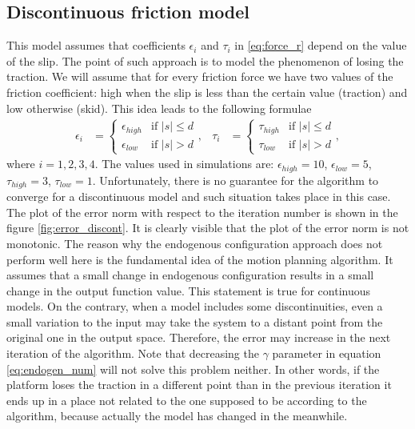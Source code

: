 \subsection{Discontinuous friction model}
This model assumes that coefficients $\epsilon_i$ and $\tau_i$ in \eqref{eq:force_r} depend on the value of the slip. The point of such approach is to model the phenomenon of losing the traction. We will assume that for every friction force we have two values of the friction coefficient: high when the slip is less than the certain value (traction) and low otherwise (skid). This idea leads to the following formulae
\begin{equation*}
\begin{aligned}
\epsilon_i&=\begin{cases}
\epsilon_{high} &\mbox{if } |s| \leq d \\
\epsilon_{low} &\mbox{if } |s| > d
\end{cases}, &
\tau_i&=\begin{cases}
\tau_{high} &\mbox{if } |s| \leq d \\
\tau_{low} &\mbox{if } |s| > d
\end{cases},
\end{aligned}
\end{equation*}
where $i=1, 2, 3, 4$. The values used in simulations are: $\epsilon_{high}=10$, $\epsilon_{low}=5$, $\tau_{high}=3$, $\tau_{low}=1$. Unfortunately, there is no guarantee for the algorithm to converge for a discontinuous model and such situation takes place in this case. The plot of the error norm with respect to the iteration number is shown in the figure \ref{fig:error_discont}. It is clearly visible that the plot of the error norm is not monotonic. The reason why the endogenous configuration approach does not perform well here is the fundamental idea of the motion planning algorithm. It assumes that a small change in endogenous configuration results in a small change in the output function value. This statement is true for continuous models. On the contrary, when a model includes some discontinuities, even a small variation to the input may take the system to a distant point from the original one in the output space. Therefore, the error may increase in the next iteration of the algorithm. Note that decreasing the $\gamma$ parameter in equation \eqref{eq:endogen_num} will not solve this problem neither.
In other words, if the platform loses the traction in a different point than in the previous iteration it ends up in a place not related to the one supposed to be according to the algorithm, because actually the model has changed in the meanwhile.

